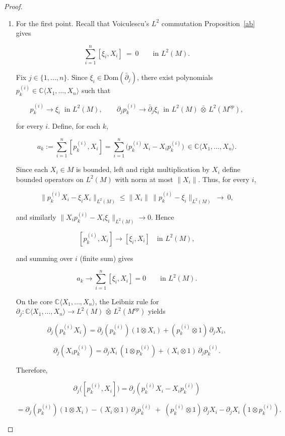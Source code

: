 \documentclass[10pt,a4paper,reqno]{amsart}
\newcommand{\A}{\mathbb{C}\langle X_1,\dots,X_n\rangle}
\newcommand{\Dom}{\mathrm{Dom}}
\begin{document}
\begin{proof}
\begin{enumerate}
    \item For the first point.
Recall that Voiculescu’s $L^2$ commutation Proposition~\ref{ab} gives


\[
\sum_{i=1}^n [\xi_i,X_i]\ =\ 0 \qquad\text{in }L^2(M).
\]



Fix $j\in\{1,\dots,n\}$.
Since $\xi_i\in \Dom(\bar\partial_j)$, there exist polynomials $p_k^{(i)}\in\A$ such that


\[
p_k^{(i)}\to \xi_i \ \text{ in }L^2(M),
\qquad
\partial_j p_k^{(i)}\to \bar\partial_j\xi_i \ \text{ in }L^2(M)\,\bar\otimes\,L^2(M^{op}),
\]


for every $i$.
Define, for each $k$,


\[
a_k := \sum_{i=1}^n [p_k^{(i)},X_i]
     = \sum_{i=1}^n\big(p_k^{(i)}X_i - X_i p_k^{(i)}\big)\ \in \A.
\]



Since each $X_i\in M$ is bounded, left and right multiplication by $X_i$ define bounded
operators on $L^2(M)$ with norm at most $\|X_i\|$. Thus, for every $i$,


\[
\|p_k^{(i)}X_i - \xi_i X_i\|_{L^2(M)}
 \le \|X_i\|\,\|p_k^{(i)}-\xi_i\|_{L^2(M)}\ \longrightarrow\ 0,
\]


and similarly $\|X_i p_k^{(i)} - X_i\xi_i\|_{L^2(M)}\to 0$.
Hence


\[
[p_k^{(i)},X_i] \longrightarrow [\xi_i,X_i]\quad\text{in }L^2(M),
\]


and summing over $i$ (finite sum) gives


\[
a_k \longrightarrow \sum_{i=1}^n [\xi_i,X_i] = 0
\qquad\text{in }L^2(M).
\]



On the core $\A$, the Leibniz rule for $\partial_j:\A\to L^2(M)\,\bar\otimes\,L^2(M^{op})$ yields


\[
\partial_j(p_k^{(i)}X_i)
  = \partial_j(p_k^{(i)})(1\otimes X_i) + (p_k^{(i)}\otimes 1)\,\partial_j X_i,
\]




\[
\partial_j(X_i p_k^{(i)})
  = \partial_j X_i\,(1\otimes p_k^{(i)}) + (X_i\otimes 1)\,\partial_j p_k^{(i)}.
\]


Therefore,


\[
\partial_j\big([p_k^{(i)},X_i]\big)
 = \partial_j(p_k^{(i)}X_i - X_i p_k^{(i)})
\]




\[
 = \partial_j(p_k^{(i)})(1\otimes X_i) - (X_i\otimes 1)\,\partial_j p_k^{(i)}
   \;+\; (p_k^{(i)}\otimes 1)\,\partial_j X_i - \partial_j X_i\,(1\otimes p_k^{(i)}).
\]



\end{enumerate}
\end{proof}
\end{document}
